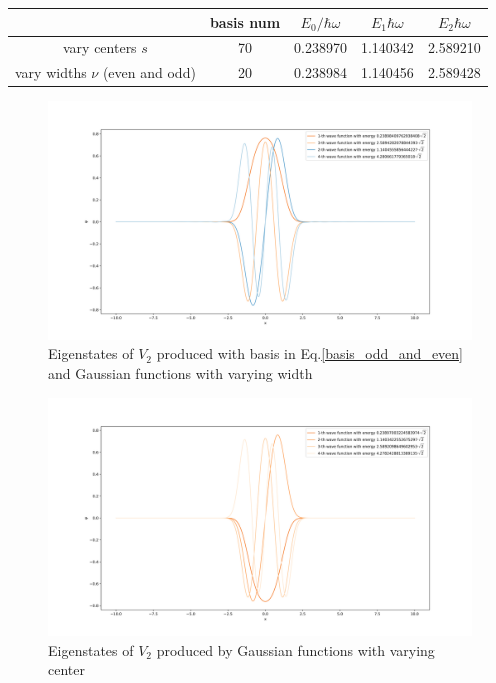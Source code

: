 \documentclass{article}
\begin{document}
\begin{center}
    \begin{tabular}{c|c|c|c|c}
        \hline
         &basis num& $E_0/\hbar\omega$ & $E_1\hbar\omega$ & $E_2\hbar\omega$\\
        \hline        
        vary centers $s$ &70& 0.238970 &1.140342 & 2.589210\\
        vary widths $\nu$ (even and odd)& 20 & 0.238984 & 1.140456& 2.589428\\
        \hline
    \end{tabular}\label{table:V2}
\end{center}
\begin{figure}[!htb]
    \centering
    \includegraphics[width=1\textwidth]{V2_width_odd_and_even_wavefuncplot_basis_num=10.png}
    \caption{Eigenstates of $V_2$ produced with basis in Eq.\ref{basis_odd_and_even} and Gaussian functions with varying width}
    \label{fig:V2_even_and_odd}
\end{figure}
\begin{figure}[!htb]
    \centering
    \includegraphics[width=1\textwidth]{V2_center_wavefuncplot_basis_num=70.png}
    \caption{Eigenstates of $V_2$ produced by Gaussian functions with varying center}
    \label{fig:V2_centers}
\end{figure}
\end{document}
